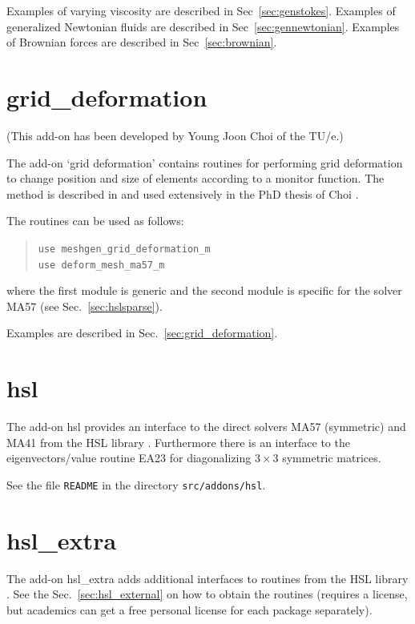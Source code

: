 Examples of varying viscosity are described in Sec~\ref{sec:genstokes}.
Examples of generalized Newtonian fluids are described in Sec~\ref{sec:gennewtonian}.
Examples of Brownian forces are described in Sec~\ref{sec:brownian}.

\section{grid\_deformation}
\label{sec:addon_grid_deformation}

(This add-on has been developed by Young Joon Choi of the TU/e.)

The add-on `grid deformation' contains routines for performing grid deformation
to change position and size of elements according to a monitor function.
The method is described in \cite{Wan07,Grajewski09} and used extensively in
the PhD thesis of Choi \cite{Choi11b}.

The routines can be used as follows:
\begin{quote}
   \texttt{use meshgen\_grid\_deformation\_m}\\
   \texttt{use deform\_mesh\_ma57\_m}
\end{quote}
where the first module is generic and the second module is specific for the
solver MA57 (see Sec.~\ref{sec:hslsparse}).

Examples are described in Sec.~\ref{sec:grid_deformation}.

\section{hsl}
\label{sec:hsl_addon}

The add-on hsl provides an interface to the direct solvers MA57 (symmetric) and MA41 from the HSL library \cite{HSL}. Furthermore there is an interface to the eigenvectors/value routine EA23 for diagonalizing $3\times3$ symmetric matrices.

See the file \texttt{README} in the directory \texttt{src/addons/hsl}.

\section{hsl\_extra}
\label{sec:hsl_extra_addon}

The add-on hsl\_extra adds additional interfaces to routines from the HSL library \cite{HSL}.
See the Sec.~\ref{sec:hsl_external} on how to obtain
the routines (requires a license, but academics can get a free personal license for each package separately).

